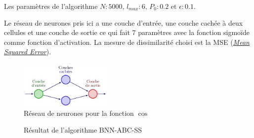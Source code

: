 \documentclass[french,12pt]{article}
\begin{document}
Les paramètres de l'algorithme $N : 5000$, $l_{max} : 6$, $P_0 : 0.2$ et $\epsilon : 0.1$.

Le réseau de neurones pris ici a une couche d'entrée, une couche cachée à deux cellules et une couche de sortie ce qui
fait 7 paramètres avec la fonction sigmoïde comme fonction d'activation. La mesure de dissimilarité
choisi est la MSE (\href{https://en.wikipedia.org/wiki/Mean_squared_error}{\textit{Mean Squared Error}}).

\begin{figure}[H]
    \centering
    \includegraphics[width = 0.4\textwidth]{FNN/Images/fnnCos/fnnCos_page-0001.jpg}
    \caption[short]{Réseau de neurones pour la fonction $\cos$}
\end{figure}


\begin{figure}[H]
    \centering
    \caption[short]{Résultat de l'algorithme BNN-ABC-SS}
\end{figure}
\end{document}
